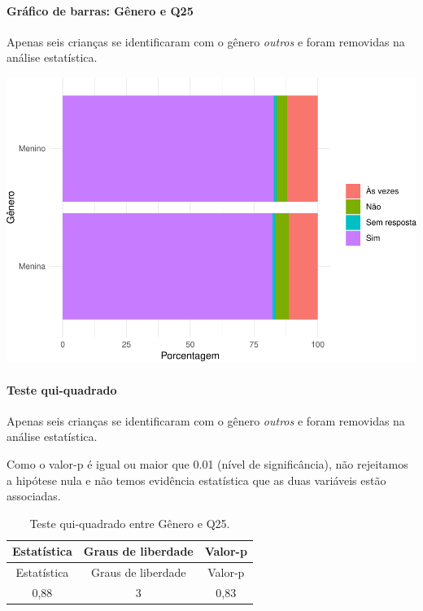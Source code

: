 \documentclass[]{article}
\let\oldparagraph\paragraph
\renewcommand{\paragraph}[1]{\oldparagraph{#1}\mbox{}}
\begin{document}
\hypertarget{gruxe1fico-de-barras-guxeanero-e-q25}{%
\paragraph{Gráfico de barras: Gênero e Q25}\label{gruxe1fico-de-barras-guxeanero-e-q25}}

Apenas seis crianças se identificaram com o gênero \emph{outros} e foram removidas na análise estatística.

\begin{center}\includegraphics[width=0.75\linewidth]{relatorio_covid19_files/figure-latex/unnamed-chunk-672-1} \end{center}

\hypertarget{teste-qui-quadrado-58}{%
\paragraph{Teste qui-quadrado}\label{teste-qui-quadrado-58}}

Apenas seis crianças se identificaram com o gênero \emph{outros} e foram removidas na análise estatística.

Como o valor-p é igual ou maior que 0.01 (nível de significância), não rejeitamos a hipótese nula e não temos evidência estatística que as duas variáveis estão associadas.

\begin{longtable}[]{@{}ccc@{}}
\caption{\label{tab:unnamed-chunk-674}Teste qui-quadrado entre Gênero e Q25.}\tabularnewline
\toprule
Estatística & Graus de liberdade & Valor-p\tabularnewline
\midrule
\endfirsthead
\toprule
Estatística & Graus de liberdade & Valor-p\tabularnewline
\midrule
\endhead
0,88 & 3 & 0,83\tabularnewline
\bottomrule
\end{longtable}

\cleardoublepage
\end{document}
